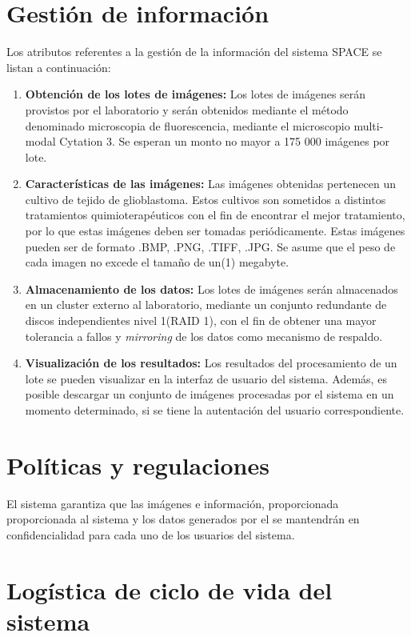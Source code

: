 \documentclass{scrreprt}
\begin{document}
\section{Gestión de información}

Los  atributos referentes a la gestión de la información del sistema SPACE se listan a continuación:

\begin{enumerate}[label=\alph*.]
\item  \textbf{Obtención de los lotes de imágenes:} Los lotes de imágenes serán provistos por el laboratorio y serán obtenidos mediante el método denominado microscopia de fluorescencia, mediante el microscopio multi-modal Cytation 3. Se esperan un monto no mayor a 175 000 imágenes por lote.
\item  \textbf{Características de las imágenes:} Las imágenes obtenidas pertenecen un cultivo de tejido de glioblastoma. Estos cultivos son sometidos a distintos tratamientos quimioterapéuticos con el fin de encontrar el mejor tratamiento, por lo que estas imágenes deben ser tomadas periódicamente. Estas imágenes pueden ser de formato .BMP, .PNG, .TIFF, .JPG. Se asume que el peso de cada imagen no excede el tamaño de un(1) megabyte.  
\item  \textbf{Almacenamiento de los datos:} Los lotes de imágenes serán almacenados en un cluster externo al laboratorio, mediante un conjunto redundante de discos independientes nivel 1(RAID 1), con el fin de obtener una mayor tolerancia a fallos y \textit{mirroring} de los datos como mecanismo de respaldo.
\item  \textbf{Visualización de los resultados:} Los resultados del procesamiento de un lote se pueden visualizar en la interfaz de usuario del sistema. Además, es posible descargar un conjunto de imágenes procesadas por el sistema en un momento determinado, si se tiene la autentación del usuario correspondiente.
\end{enumerate}


\section{Políticas y regulaciones}

El sistema garantiza que las imágenes e información, proporcionada proporcionada al sistema y los datos generados por el se mantendrán en confidencialidad para cada uno de los usuarios del sistema. 


\section{Logística de ciclo de vida del sistema}
\end{document}
